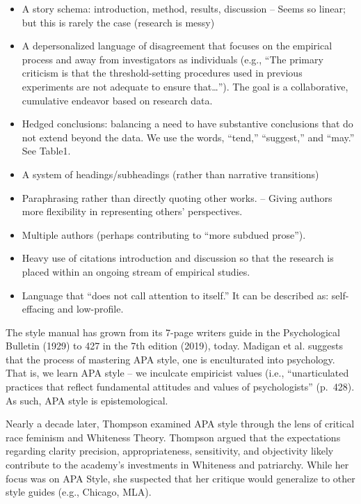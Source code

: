 \documentclass[
  11pt,
]{book}
\providecommand{\tightlist}{%
  \setlength{\itemsep}{0pt}\setlength{\parskip}{0pt}}
\begin{document}
\begin{itemize}
\tightlist
\item
  A story schema: introduction, method, results, discussion
  -- Seems so linear; but this is rarely the case (research is messy)
\item
  A depersonalized language of disagreement that focuses on the empirical process and away from investigators as individuals (e.g., ``The primary criticism is that the threshold-setting procedures used in previous experiments are not adequate to ensure that\ldots{}''). The goal is a collaborative, cumulative endeavor based on research data.
\item
  Hedged conclusions: balancing a need to have substantive conclusions that do not extend beyond the data. We use the words, ``tend,'' ``suggest,'' and ``may.'' See Table1.
\item
  A system of headings/subheadings (rather than narrative transitions)
\item
  Paraphrasing rather than directly quoting other works.
  -- Giving authors more flexibility in representing others' perspectives.
\item
  Multiple authors (perhaps contributing to ``more subdued prose'').
\item
  Heavy use of citations introduction and discussion so that the research is placed within an ongoing stream of empirical studies.
\item
  Language that ``does not call attention to itself.'' It can be described as: self-effacing and low-profile.
\end{itemize}

The style manual has grown from its 7-page writers guide in the Psychological Bulletin (1929) to 427 in the 7th edition (2019), today. Madigan et al. \citeyearpar{madigan_language_1995} suggests that the process of mastering APA style, one is enculturated into psychology. That is, we learn APA style -- we inculcate empiricist values (i.e., ``unarticulated practices that reflect fundamental attitudes and values of psychologists'' (p.~428). As such, APA style is epistemological.

Nearly a decade later, Thompson \citeyearpar{thompson_gentlemanly_2004} examined APA style through the lens of critical race feminism and Whiteness Theory. Thompson argued that the expectations regarding clarity precision, appropriateness, sensitivity, and objectivity likely contribute to the academy's investments in Whiteness and patriarchy. While her focus was on APA Style, she suspected that her critique would generalize to other style guides (e.g., Chicago, MLA).
\end{document}
